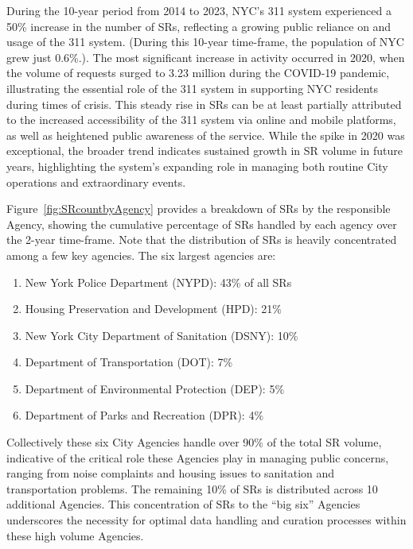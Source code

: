 \documentclass[linenumber]{jdsart}
\begin{document}
During the 10\mbox{-}year period from 2014 to 2023,  NYC's 311 system
experienced a 50\% increase in the number of SRs, 
reflecting a growing public reliance on and usage of 
the 311 system. (During this 10\mbox{-}year time-frame, the 
population of NYC grew just 0.6\%.). The most significant increase
in activity occurred in 2020, when the volume of requests 
surged to 3.23 million during the COVID\mbox{-}19 pandemic, 
illustrating the essential role of the 311 system in supporting 
NYC residents during times of crisis. This steady 
rise in SRs can be at least partially attributed to the increased 
accessibility of the 311 system via online and mobile 
platforms, as well as heightened public awareness of the service. 
While the spike in 2020 was exceptional, the broader trend 
indicates sustained growth in SR volume in future years,  
highlighting the system's expanding role in managing 
both routine City operations and extraordinary events.

Figure~\ref{fig:SRcountbyAgency} provides a breakdown of SRs by
the responsible Agency, showing the cumulative 
percentage of SRs handled by each
agency over the 2\mbox{-}year time-frame. Note that the
distribution of SRs is heavily concentrated among a few key 
agencies. The six largest agencies are:

\begin{enumerate}[left=1.5em]
    \item New York Police Department (NYPD): 43\% of all SRs
    \item Housing Preservation and Development (HPD): 21\%
    \item New York City Department of Sanitation (DSNY): 10\%
    \item Department of Transportation (DOT): 7\%
    \item Department of Environmental Protection (DEP): 5\%
    \item Department of Parks and Recreation (DPR): 4\%
\end{enumerate}

Collectively these six City Agencies handle over 90\% of the total SR 
volume, indicative of the critical role these Agencies play in managing
public concerns, ranging from noise complaints and housing issues to
sanitation and transportation problems. The remaining
10\% of SRs is distributed across 10 additional Agencies. 
This concentration of SRs to the ``big six'' Agencies 
underscores the necessity for optimal data handling and 
curation processes within these  high volume Agencies.
\end{document}
